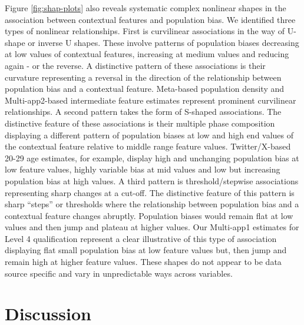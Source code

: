 \documentclass{article}
\begin{document}
Figure \ref{fig:shap-plots} also reveals systematic complex nonlinear
shapes in the association between contextual features and population
bias. We identified three types of nonlinear relationships. First is
curvilinear associations in the way of U-shape or inverse U shapes.
These involve patterns of population biases decreasing at low values of
contextual features, increasing at medium values and reducing again - or
the reverse. A distinctive pattern of these associations is their
curvature representing a reversal in the direction of the relationship
between population bias and a contextual feature. Meta-based population
density and Multi-app2-based intermediate feature estimates represent
prominent curvilinear relationships. A second pattern takes the form of
S-shaped associations. The distinctive feature of these associations is
their multiple phase composition displaying a different pattern of
population biases at low and high end values of the contextual feature
relative to middle range feature values. Twitter/X-based 20-29 age
estimates, for example, display high and unchanging population bias at
low feature values, highly variable bias at mid values and low but
increasing population bias at high values. A third pattern is
threshold/stepwise associations representing sharp changes at a cut-off.
The distinctive feature of this pattern is sharp ``steps'' or thresholds
where the relationship between population bias and a contextual feature
changes abruptly. Population biases would remain flat at low values and
then jump and plateau at higher values. Our Multi-app1 estimates for
Level 4 qualification represent a clear illustrative of this type of
association displaying flat small population bias at low feature values
but, then jump and remain high at higher feature values. These shapes do
not appear to be data source specific and vary in unpredictable ways
across variables.

\section{Discussion}\label{discussion}
\end{document}
